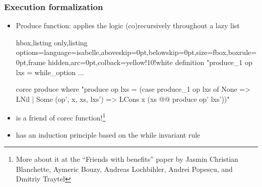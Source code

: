 \documentclass[aspectratio=169,10pt]{beamer}
\begin{document}
\begin{frame}[fragile]
  \frametitle{Execution formalization}
  \begin{itemize}
    \item Produce function: applies the logic (co)recursively throughout a lazy list
          \vspace*{-1.5ex}
          \begin{tcblisting}{hbox,listing only,listing options={language=isabelle,aboveskip=0pt,belowskip=0pt},size=fbox,boxrule=0pt,frame hidden,arc=0pt,colback=yellow!10!white}
definition "produce_1 op lxs = while_option $\ldots$

corec produce where
"produce op lxs = (case produce_1 op lxs of
  None => LNil
| Some (op', x, xs, lxs') => LCons x (xs @@ produce op' lxs'))"
          \end{tcblisting}
          \vspace*{-1.5ex}
    \item {} is a friend of corec function!\footnote{More about it at the ``Friends with benefits'' paper by Jasmin Christian Blanchette, Aymeric Bouzy, Andreas Lochbihler, Andrei Popescu, and
Dmitriy Traytel}
          \pause
    \item {} has an induction principle based on the while invariant rule
  \end{itemize}
\end{frame}
\end{document}
